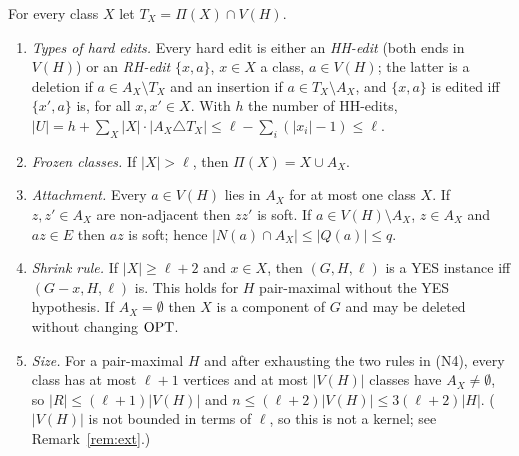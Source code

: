 \begin{corollary}\label{cor:nf}
For every class $X$ let $T_X=\Pi(X)\cap V(H)$.
\begin{enumerate}
\item[(N1)] \emph{Types of hard edits.} Every hard edit is either an \emph{HH-edit} (both ends in $V(H)$) or an \emph{RH-edit} $\{x,a\}$, $x\in X$ a class, $a\in V(H)$; the latter is a deletion if $a\in A_X\setminus T_X$ and an insertion if $a\in T_X\setminus A_X$, and $\{x,a\}$ is edited iff $\{x',a\}$ is, for all $x,x'\in X$. With $h$ the number of HH-edits,
$|U|=h+\sum_X|X|\cdot|A_X\triangle T_X|\le\ell-\sum_i(|x_i|-1)\le \ell.$
\item[(N2)] \emph{Frozen classes.} If $|X|>\ell$, then $\Pi(X)=X\cup A_X$.
\item[(N3)] \emph{Attachment.} Every $a\in V(H)$ lies in $A_X$ for at most one class $X$. If $z,z'\in A_X$ are non-adjacent then $zz'$ is soft. If $a\in V(H)\setminus A_X$, $z\in A_X$ and $az\in E$ then $az$ is soft; hence $|N(a)\cap A_X|\le|Q(a)|\le q$.
\item[(N4)] \emph{Shrink rule.} If $|X|\ge\ell+2$ and $x\in X$, then $(G,H,\ell)$ is a YES instance iff $(G-x,H,\ell)$ is. This holds for $H$ pair-maximal without the YES hypothesis. If $A_X=\emptyset$ then $X$ is a component of $G$ and may be deleted without changing $\mathrm{OPT}$.
\item[(N5)] \emph{Size.} For a pair-maximal $H$ and after exhausting the two rules in (N4), every class has at most $\ell+1$ vertices and at most $|V(H)|$ classes have $A_X\ne\emptyset$, so $|R|\le(\ell+1)|V(H)|$ and $n\le(\ell+2)|V(H)|\le 3(\ell+2)|H|$. ($|V(H)|$ is not bounded in terms of $\ell$, so this is not a kernel; see Remark~\ref{rem:ext}.)
\end{enumerate}
\end{corollary}

